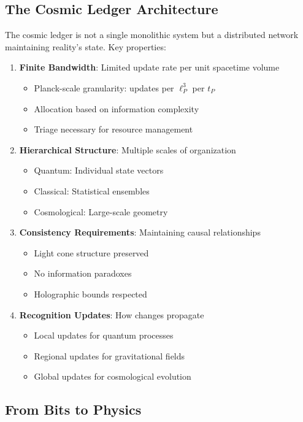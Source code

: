 \documentclass[12pt,letterpaper]{article}
\begin{document}
\subsection{The Cosmic Ledger Architecture}

The cosmic ledger is not a single monolithic system but a distributed network maintaining reality's state. Key properties:

\begin{enumerate}
\item \textbf{Finite Bandwidth}: Limited update rate per unit spacetime volume
\begin{itemize}
\item Planck-scale granularity: updates per $\ell_P^3$ per $t_P$
\item Allocation based on information complexity
\item Triage necessary for resource management
\end{itemize}

\item \textbf{Hierarchical Structure}: Multiple scales of organization
\begin{itemize}
\item Quantum: Individual state vectors
\item Classical: Statistical ensembles
\item Cosmological: Large-scale geometry
\end{itemize}

\item \textbf{Consistency Requirements}: Maintaining causal relationships
\begin{itemize}
\item Light cone structure preserved
\item No information paradoxes
\item Holographic bounds respected
\end{itemize}

\item \textbf{Recognition Updates}: How changes propagate
\begin{itemize}
\item Local updates for quantum processes
\item Regional updates for gravitational fields
\item Global updates for cosmological evolution
\end{itemize}
\end{enumerate}

\subsection{From Bits to Physics}
\end{document}

